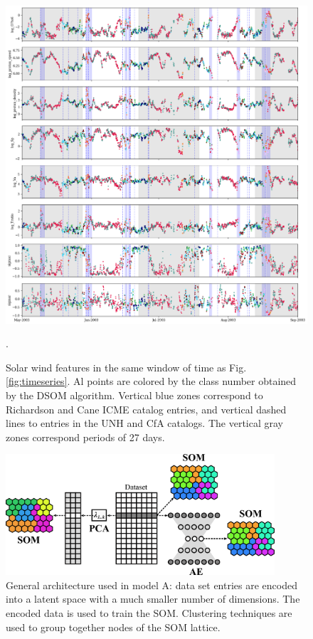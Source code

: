 \documentclass[utf8]{frontiersSCNS} %
\begin{document}
\begin{figure}[h!]
	\begin{center}
		\includegraphics[width=18cm]{Amaya/tsfeatures-som}%
	\end{center}
	\caption{Solar wind features in the same window of time as Fig.\ref{fig:timeseries}. Al points are colored by the class number obtained by the DSOM algorithm. Vertical blue zones correspond to Richardson and Cane ICME catalog entries, and vertical dashed lines to entries in the UNH and CfA catalogs. The vertical gray zones correspond periods of 27 days.}\label{fig:tsfeatures-som}.
\end{figure}

\begin{figure}[h!]
	\begin{center}
		\includegraphics[width=10cm]{architecture}%
	\end{center}
	\caption{General architecture used in model A: data set entries are encoded into a latent space with a much smaller number of dimensions. The encoded data is used to train the SOM. Clustering techniques are used to group together nodes of the SOM lattice.}\label{fig:architecture}
\end{figure}
\end{document}
